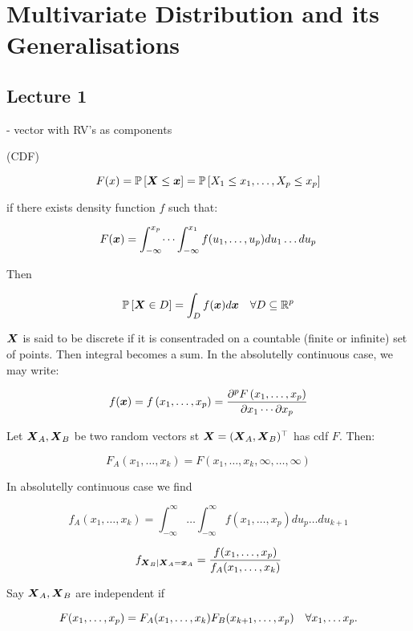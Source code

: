 \section{Multivariate Distribution and its Generalisations}
\subsection*{Lecture 1}

 - vector with RV's as components


 (CDF)

$$
    F(x)=\mathbb{P}\left[\boldsymbol{X}\leq \boldsymbol{x}\right] = \mathbb{P}\left[X_1\leq x_1,\dots,X_p\leq x_p\right]
$$

 if there exists density function $f$ such that:

$$
    F(\boldsymbol{x})=\int_{-\infty}^{x_p}\dots\int_{-\infty}^{x_1} f(u_1,\dots,u_p) du_1\dots du_p
$$

Then 

$$
    \mathbb{P}\left[\boldsymbol{X}\in D\right] = \int_D f(\boldsymbol{x}) d\boldsymbol{x} \quad\forall D\subseteq \mathbb{R}^p
$$

$\boldsymbol{X}$ is said to be discrete if it is consentraded on a countable (finite or infinite) set of points. Then integral becomes a sum. In the absolutelly continuous case, we may write:

$$
    f(\boldsymbol{x})=f\left(x_1, \ldots, x_p\right)=\frac{\partial^p F\left(x_1, \ldots, x_p\right)}{\partial x_1 \cdots \partial x_p}
$$

\textbf{} 

Let $\boldsymbol{X}_A, \boldsymbol{X}_B$ be two random vectors st $\boldsymbol{X}=(\boldsymbol{X}_A,\boldsymbol{X}_B)^\top$ has cdf $F$. Then:

$$
    F_A(x_1,\dots,x_k) = F(x_1,\dots,x_k,\infty,\dots,\infty)
$$

In absolutelly continuous case we find

$$
    f_A(x_1,\dots,x_k) = \int_{-\infty}^{\infty}\dots\int_{-\infty}^{\infty} f(x_1,\dots,x_p) du_p\dots du_{k+1}
$$

\textbf{} 

$$
    f_{\boldsymbol{X}_B|\boldsymbol{X}_A=\boldsymbol{x}_A} = \frac{f(x_1,\dots,x_p)}{f_A(x_1,\dots,x_k)}
$$

\textbf{} 

Say $\boldsymbol{X}_A, \boldsymbol{X}_B$ are independent if 

$$
    F(x_1,\dots,x_p)=F_A(x_1,\dots,x_k)F_B(x_{k+1},\dots,x_p) \quad\forall x_1,\dots x_p.
$$

